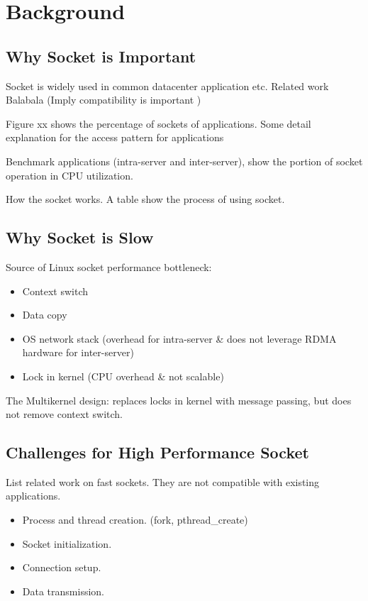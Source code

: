 \section{Background}
\label{sec:background}

\subsection{Why Socket is Important}

Socket is widely used in common datacenter application etc. Related work Balabala (Imply compatibility is important )

Figure xx shows the percentage of sockets of applications. Some detail explanation for the access pattern for applications

Benchmark applications (intra-server and inter-server), show the portion of socket operation in CPU utilization.

How the socket works. A table show the process of using socket.

\subsection{Why Socket is Slow}
Source of Linux socket performance bottleneck:
\begin{itemize}
	\item Context switch
	\item Data copy
	\item OS network stack (overhead for intra-server \& does not leverage RDMA hardware for inter-server)
	\item Lock in kernel (CPU overhead \& not scalable)
\end{itemize}

The Multikernel design: replaces locks in kernel with message passing, but does not remove context switch.

\subsection{Challenges for High Performance Socket}

List related work on fast sockets. They are not compatible with existing applications.

\begin{itemize}
	\item Process and thread creation. (fork, pthread\_create)
	\item Socket initialization.
	\item Connection setup.
	\item Data transmission.
\end{itemize}

